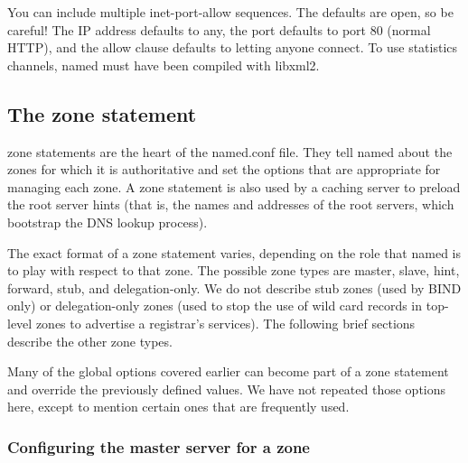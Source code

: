 
You can include multiple {inet-port-allow} sequences. The defaults are
open, so be careful! The IP address defaults to {any}, the port defaults
to port 80 (normal HTTP), and the {allow} clause defaults to letting
anyone connect. To use statistics channels, {named} must have been
compiled with {libxml2}.

\protect\hypertarget{part0024_split_044.html}{}{}

\hypertarget{part0024_split_044.htmlux5cux23_idContainer1069}{}
\hypertarget{part0024_split_044.htmlux5cux23calibre_pb_43}{%
\subsection[The {zone}
statement]{\texorpdfstring{\protect\hypertarget{part0024_split_044.htmlux5cux23_idTextAnchor912}{}{}The
{zone}
statement}{The zone statement}}\label{part0024_split_044.htmlux5cux23calibre_pb_43}}

\protect\hypertarget{part0024_split_044.htmlux5cux23_idIndexMarker2184}{}{}\protect\hypertarget{part0024_split_044.htmlux5cux23_idIndexMarker2185}{}{}{zone}
statements are the heart of the {named.conf} file. They tell {named}
about the zones for which it is authoritative and set the options that
are appropriate for managing each zone. A {zone} statement is also used
by a caching server to preload the root server hints (that is, the names
and addresses of the root servers, which bootstrap the DNS lookup
process).

The exact format of a {zone} statement varies, depending on the role
that {named} is to play with respect to that zone. The possible zone
types are {master}, {slave}, {hint}, {forward}, {stub}, and
{delegation-only}. We do not describe {stub} zones (used by BIND only)
or {delegation-only} zones (used to stop the use of wild card records in
top-level zones to advertise a registrar's services). The following
brief sections describe the other zone types.

Many of the global options covered earlier can become part of a {zone}
statement and override the previously defined values. We have not
repeated those options here, except to mention certain ones that are
frequently used.

\subsubsection[Configuring the master server for a
zone]{\texorpdfstring{\protect\hypertarget{part0024_split_044.htmlux5cux23_idTextAnchor913}{}{}Configuring
the master server for a zone}{Configuring the master server for a zone}}

